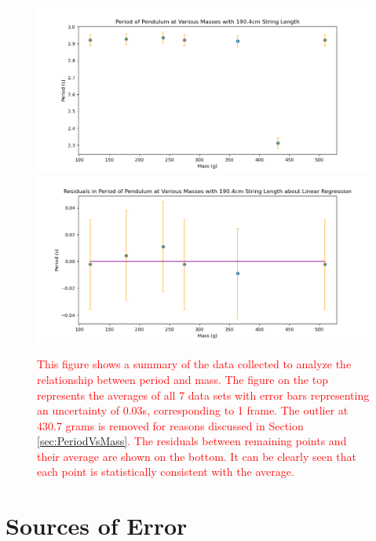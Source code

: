 \documentclass[11pt]{article}
\begin{document}
        \begin{figure}[H]
            \includegraphics[width = \textwidth]{PeriodVsMass.png}
            \includegraphics[width = \textwidth]{ResidualsPeriodVsMass.png}
            \caption{\textcolor{red}{This figure shows a summary of the data collected to analyze the relationship between period and mass. The figure on the top represents the averages of all 7 data sets with error bars representing an uncertainty of 0.03s, corresponding to 1 frame. The outlier at 430.7 grams is removed for reasons discussed in Section \ref{sec:PeriodVsMass}. The residuals between remaining points and their average are shown on the bottom. It can be clearly seen that each point is statistically consistent with the average.}}
            \label{fig:AnalyzedMassVsPeriod}
        \end{figure}

    \section{Sources of Error}        
\end{document}
